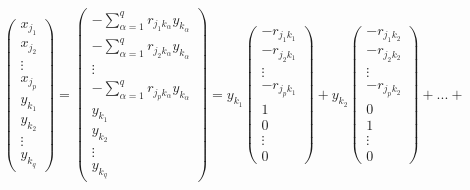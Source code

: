 \begin{deriv}
    \begin{align*}
        \begin{pmatrix}
            x_{j_1} \\
            x_{j_2} \\
            \vdots \\
            x_{j_p} \\
            y_{k_1} \\ 
            y_{k_2} \\
            \vdots \\
            y_{k_q}
        \end{pmatrix}
        =
        \begin{pmatrix}
            -\sum_{\alpha = 1}^q r_{j_1 k_\alpha} y_{k_\alpha} \\
            -\sum_{\alpha = 1}^q r_{j_2 k_\alpha} y_{k_\alpha} \\
            \vdots \\
            -\sum_{\alpha = 1}^q r_{j_p k_\alpha} y_{k_\alpha} \\
            y_{k_1} \\
            y_{k_2} \\
            \vdots \\
            y_{k_q}
        \end{pmatrix}
        =
        y_{k_1}
        \begin{pmatrix}
            -r_{j_1 k_1} \\
            -r_{j_2 k_1} \\
            \vdots \\
            -r_{j_p k_1} \\
            1 \\
            0 \\
            \vdots \\
            0
        \end{pmatrix}
        +
        y_{k_2}
        \begin{pmatrix}
            -r_{j_1 k_2} \\
            -r_{j_2 k_2} \\
            \vdots \\
            -r_{j_p k_2} \\
            0 \\
            1 \\
            \vdots \\
            0
        \end{pmatrix}
        + ... +

\end{align*}
\end{deriv}
